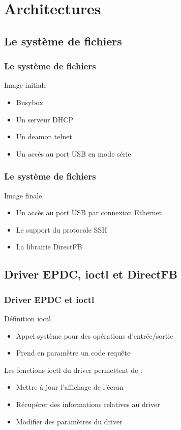 \section{Architectures}
\subsection{Le système de fichiers}
\begin{frame}
\frametitle{Le système de fichiers}

\begin{block}{Image initiale}
\begin{itemize}
\item Busybox
\item Un serveur DHCP
\item Un deamon telnet
\item Un accès au port USB en mode série 
\end{itemize}
\end{block}
\end{frame}

\begin{frame}
\frametitle{Le système de fichiers}
\begin{block}{Image finale}
\begin{itemize}
\item Un accès au port USB par connexion Ethernet
\item Le support du protocole SSH
\item La librairie DirectFB
\end{itemize}
\end{block}

\end{frame}

\subsection{Driver EPDC, ioctl et DirectFB}

\begin{frame}
\frametitle{Driver EPDC et ioctl}

\begin{block}{Définition ioctl}
\begin{itemize}
\item Appel système pour des opérations d'entrée/sortie
\item Prend en paramètre un code requête
\end{itemize}
\end{block}
\begin{block}{Les fonctions ioctl du driver permettent de :}
\begin{itemize}
\item Mettre à jour l'affichage de l'écran
\item Récupérer des informations relatives au driver
\item Modifier des paramètres du driver
\end{itemize}
\end{block}

\end{frame}

